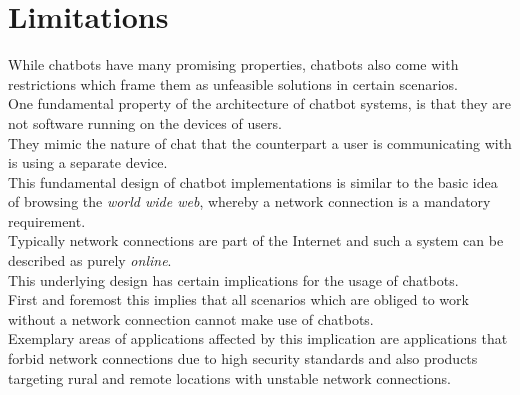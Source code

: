 \section{Limitations}
\label{limitations}


While chatbots have many promising properties, chatbots also come with restrictions
which frame them as unfeasible solutions in certain scenarios.
\\

One fundamental property of the architecture of chatbot systems,
is that they are not software running on the devices of users.
\\
They mimic the nature of chat that the counterpart a user is communicating with is using a separate device.
\\
This fundamental design of chatbot implementations is similar to the basic
idea of browsing the \emph{world wide web}, whereby a network connection is a mandatory requirement.
\\
Typically network connections are part of the Internet
and such a system can be described as purely \emph{online}.
\\

This underlying design has certain implications for the usage of chatbots.
\\

First and foremost this implies that all scenarios which are obliged to work without a network connection
cannot make use of chatbots.
\\
Exemplary areas of applications affected by this implication are
applications that forbid network connections due to high security standards
and also products targeting rural and remote locations with unstable network connections.
\\

